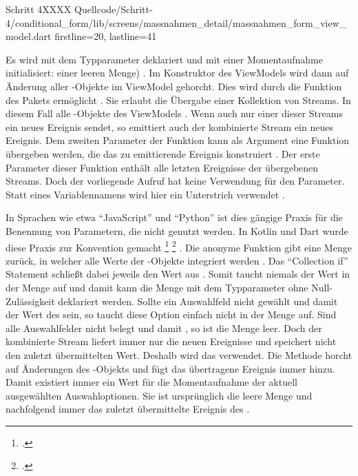 \begin{alexlisting}{Schritt 4}{XXXX}
  {Quellcode/Schritt-4/conditional_form/lib/screens/massnahmen_detail/massnahmen_form_view_model.dart}
  {firstline=20, lastline=41}
  \label{lst:Schritt4priorChoices}
\end{alexlisting}

Es wird mit dem Typparameter  deklariert  und mit einer Momentaufnahme initialisiert: einer leeren Menge) .
Im Konstruktor des ViewModels wird dann auf Änderung aller -Objekte im ViewModel gehorcht.
Dies wird durch die Funktion  des Pakets  ermöglicht .
Sie erlaubt die Übergabe einer Kollektion von Streams.
In diesem Fall alle -Objekte des ViewModels .
Wenn auch nur einer dieser Streams ein neues Ereignis sendet,
so emittiert auch der kombinierte Stream ein neues Ereignis.
Dem zweiten Parameter der Funktion  kann als Argument eine Funktion übergeben werden,
die das zu emittierende Ereignis konstruiert .
Der erste Parameter dieser Funktion enthält alle letzten Ereignisse der übergebenen Streams.
Doch der vorliegende Aufruf hat keine Verwendung für den Parameter.
Statt eines Variablennamens wird hier ein Unterstrich \IC{_} verwendet .

In Sprachen wie etwa \enquote{JavaScript} und \enquote{Python} ist dies gängige Praxis für die Benennung von Parametern,
die nicht genutzt werden.
In Kotlin und Dart wurde diese Praxis zur Konvention gemacht
\footcite[Vgl.][]{DartEffectiveDartStylePREFERusingUnderscore}
\footcite[Vgl.][]{KotlinHighOrderFunctionsAndLambdasUnderscoreForUnusedVariables}
. 
Die anonyme Funktion gibt eine Menge zurück,
in welcher alle Werte der -Objekte integriert werden .
Das \enquote{Collection if} Statement schließt dabei jeweils den Wert  aus .
Somit taucht niemals der Wert  in der Menge auf und damit kann die Menge mit dem Typparameter  ohne Null-Zulässigkeit deklariert werden.
Sollte ein Auswahlfeld nicht gewählt und damit der Wert des   sein, so taucht diese Option einfach nicht in der Menge auf.
Sind alle Auswahlfelder nicht belegt und damit , so ist die Menge leer.
Doch der kombinierte Stream  liefert immer nur die neuen Ereignisse und speichert nicht den zuletzt übermittelten Wert.
Deshalb wird das   verwendet.
Die Methode  horcht auf Änderungen des -Objekts und fügt das übertragene Ereignis immer  hinzu. 
Damit existiert immer ein Wert für die Momentaufnahme der aktuell ausgewählten Auswahloptionen.
Sie ist ursprünglich die leere Menge \IC{{}} und nachfolgend immer das zuletzt übermittelte Ereignis des .

